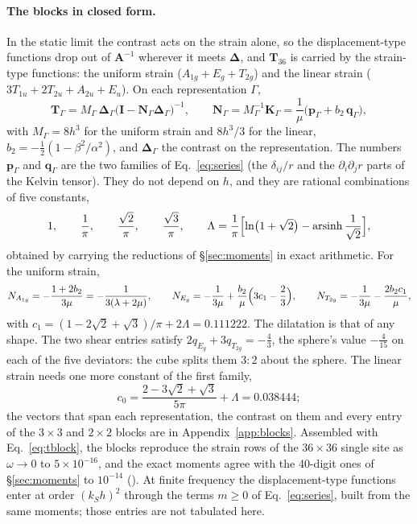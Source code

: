 \documentclass[11pt,a4paper]{article}
\newcommand{\bI}{\mathbf{I}}
\newcommand{\bK}{\mathbf{K}}
\newcommand{\bT}{\mathbf{T}}
\newcommand{\bD}{\boldsymbol{\Delta}}
\begin{document}
\paragraph{The blocks in closed form.} In the static limit the contrast acts on the strain alone, so the
displacement-type functions drop out of $\mathbf{A}^{-1}$ wherever it meets $\bD$, and $\bT_{36}$ is carried
by the strain-type functions: the uniform strain ($A_{1g}+E_g+T_{2g}$) and the linear strain
($3T_{1u}+2T_{2u}+A_{2u}+E_u$). On each representation $\Gamma$,
\begin{equation}\label{eq:tblock}
  \bT_\Gamma=M_\Gamma\,\boldsymbol\Delta_\Gamma\bigl(\bI-\mathbf{N}_\Gamma\boldsymbol\Delta_\Gamma\bigr)^{-1},
  \qquad \mathbf{N}_\Gamma=M_\Gamma^{-1}\bK_\Gamma=\frac{1}{\mu}\bigl(\mathbf{p}_\Gamma+b_2\,\mathbf{q}_\Gamma\bigr),
\end{equation}
with $M_\Gamma=8h^3$ for the uniform strain and $8h^3/3$ for the linear, $b_2=-\tfrac12(1-\beta^2/\alpha^2)$,
and $\boldsymbol\Delta_\Gamma$ the contrast on the representation. The numbers $\mathbf{p}_\Gamma$ and
$\mathbf{q}_\Gamma$ are the two families of Eq.~\eqref{eq:series} (the $\delta_{ij}/r$ and the
$\partial_i\partial_jr$ parts of the Kelvin tensor). They do not depend on $h$, and they are rational
combinations of five constants,
\begin{equation}\label{eq:fiveconstants}
  1,\qquad \frac1\pi,\qquad \frac{\sqrt2}{\pi},\qquad \frac{\sqrt3}{\pi},\qquad
  \Lambda=\frac{1}{\pi}\Bigl[\ln\bigl(1+\sqrt2\bigr)-\operatorname{arsinh}\frac{1}{\sqrt2}\Bigr],
\end{equation}
obtained by carrying the reductions of \S\ref{sec:moments} in exact arithmetic.
For the uniform strain,
\begin{equation}\label{eq:uniformblocks}
  N_{A_{1g}}=-\frac{1+2b_2}{3\mu}=-\frac{1}{3(\lambda+2\mu)},\qquad
  N_{E_g}=-\frac{1}{3\mu}+\frac{b_2}{\mu}\Bigl(3c_1-\frac23\Bigr),\qquad
  N_{T_{2g}}=-\frac{1}{3\mu}-\frac{2b_2c_1}{\mu},
\end{equation}
with $c_1=(1-2\sqrt2+\sqrt3)/\pi+2\Lambda=0.111222$. The dilatation is that of any shape. The two shear
entries satisfy $2q_{E_g}+3q_{T_{2g}}=-\tfrac43$, the sphere's value $-\tfrac{4}{15}$ on each of the five
deviators: the cube splits them $3{:}2$ about the sphere. The linear strain needs one more constant of the first family,
\begin{equation}\label{eq:c0}
  c_0=\frac{2-3\sqrt2+\sqrt3}{5\pi}+\Lambda=0.038444;
\end{equation}
the vectors that span each representation, the contrast on them and every entry of the $3\times3$ and
$2\times2$ blocks are in Appendix~\ref{app:blocks}. Assembled with Eq.~\eqref{eq:tblock}, the blocks
reproduce the strain rows of the $36\times36$ single site as $\omega\to0$ to $5\times10^{-16}$, and the
exact moments agree with the 40-digit ones of \S\ref{sec:moments} to $10^{-14}$
(). At finite frequency the displacement-type functions
enter at order $(k_Sh)^2$ through the terms $m\ge0$ of Eq.~\eqref{eq:series}, built from the same moments;
those entries are not tabulated here.
\end{document}
